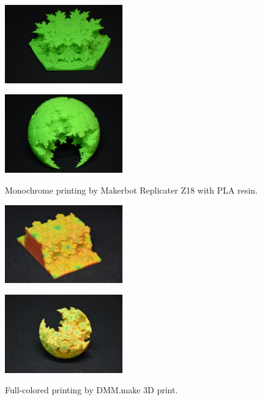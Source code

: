 \documentclass[suppldata, dvipdfmx]{interact}
\theoremstyle{plain}%
\theoremstyle{definition}
\theoremstyle{remark}
\theoremstyle{problemstyle}
\begin{document}
\begin{figure}[h!tbp]
  \begin{minipage}[t]{0.5\textwidth}
   \centering
   \includegraphics[width=2in, keepaspectratio]{./img/sphairahedron/3dprint/mono1.jpg}
   \subcaption{}
   \label{fig:mono1}
  \end{minipage}
 \hspace*{\fill}
  \begin{minipage}[t]{0.5\textwidth}
   \centering
   \includegraphics[width=2in, keepaspectratio]{./img/sphairahedron/3dprint/mono2.jpg}
   \subcaption{}
   \label{fig:mono2}
  \end{minipage}
  \hspace*{\fill}
  \caption{Monochrome printing by Makerbot Replicater Z18 with PLA resin.}
  \label{fig:3dmono}
  \begin{minipage}[t]{0.5\textwidth}
   \centering
   \includegraphics[width=2in, keepaspectratio]{./img/sphairahedron/3dprint/plaster.jpg}
   \label{fig:3dcolPlaster}
  \end{minipage}
  \hspace*{\fill}
  \begin{minipage}[t]{0.5\textwidth}
   \centering
   \includegraphics[width=2in, keepaspectratio]{./img/sphairahedron/3dprint/plastic.jpg}
   \label{fig:3dcolPlastic}
  \end{minipage}
  \hspace*{\fill}
  \caption{Full-colored printing by DMM.make 3D print.}
  \label{fig:3dcol}
\end{figure}
\end{document}
